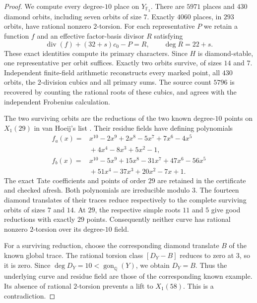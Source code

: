 \begin{proof}
We compute every degree-$10$ place on $Y_{\mathbb F_3}$.
There are $5971$ places and $430$ diamond orbits, including seven orbits of size $7$.
Exactly $4060$ places, in $293$ orbits, have rational nonzero $2$-torsion.
For each representative $P$ we retain a function $f$ and an effective
factor-basis divisor $R$ satisfying
\[
 \operatorname{div}(f)+(32+s)c_0-P=R,\qquad \deg R=22+s.
\]
These exact identities compute its primary characters.
Since $H$ is diamond-stable, one representative per orbit suffices.
Exactly two orbits survive, of sizes $14$ and $7$.
Independent finite-field arithmetic reconstructs every marked point,
all $430$ orbits, the $2$-division cubics and all primary sums.
The source count $5796$ is recovered by counting the rational roots
of these cubics, and agrees with the independent Frobenius calculation.

The two surviving orbits are the reductions of the two known degree-$10$
points on $X_1(29)$ in van Hoeij's list \cite{DvH}.
Their residue fields have defining polynomials
\[
\begin{split}
 f_a(x)={}&x^{10}-2x^9+2x^8-5x^7+7x^6-4x^5\\
          &{}+4x^4-8x^3+5x^2-1,\\
 f_b(x)={}&x^{10}-5x^9+15x^8-31x^7+47x^6-56x^5\\
          &{}+51x^4-37x^3+20x^2-7x+1.
\end{split}
\]
The exact Tate coefficients and points of order $29$ are retained
in the certificate and checked afresh.
Both polynomials are irreducible modulo $3$.
The fourteen diamond translates of their traces reduce respectively
to the complete surviving orbits of sizes $7$ and $14$.
At $29$, the respective simple roots $11$ and $5$ give good reductions
with exactly $29$ points.
Consequently neither curve has rational nonzero $2$-torsion over its degree-$10$ field.

For a surviving reduction, choose the corresponding diamond translate $B$
of the known global trace.
The rational torsion class $[D_Y-B]$ reduces to zero at $3$, so it is zero.
Since $\deg D_Y=10<\operatorname{gon}_{\mathbb Q}(Y)$, we obtain $D_Y=B$.
Thus the underlying curve and residue field are those of the corresponding
known example. Its absence of rational $2$-torsion prevents a lift to $X_1(58)$.
This is a contradiction.
\end{proof}
